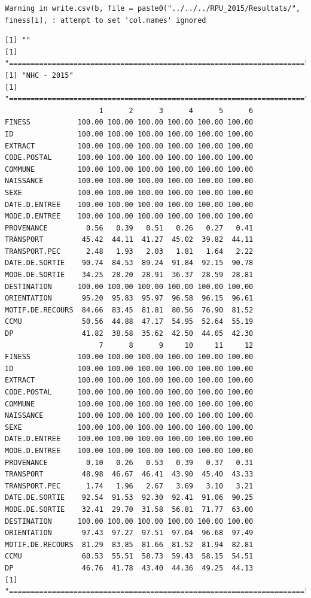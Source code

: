 \documentclass[]{article}
\begin{document}
\begin{verbatim}
Warning in write.csv(b, file = paste0("../../../RPU_2015/Resultats/",
finess[i], : attempt to set 'col.names' ignored
\end{verbatim}

\begin{verbatim}
[1] ""
[1] "====================================================================="
[1] "NHC - 2015"
[1] "====================================================================="
                      1      2      3      4      5      6
FINESS           100.00 100.00 100.00 100.00 100.00 100.00
ID               100.00 100.00 100.00 100.00 100.00 100.00
EXTRACT          100.00 100.00 100.00 100.00 100.00 100.00
CODE.POSTAL      100.00 100.00 100.00 100.00 100.00 100.00
COMMUNE          100.00 100.00 100.00 100.00 100.00 100.00
NAISSANCE        100.00 100.00 100.00 100.00 100.00 100.00
SEXE             100.00 100.00 100.00 100.00 100.00 100.00
DATE.D.ENTREE    100.00 100.00 100.00 100.00 100.00 100.00
MODE.D.ENTREE    100.00 100.00 100.00 100.00 100.00 100.00
PROVENANCE         0.56   0.39   0.51   0.26   0.27   0.41
TRANSPORT         45.42  44.11  41.27  45.02  39.82  44.11
TRANSPORT.PEC      2.48   1.93   2.03   1.81   1.64   2.22
DATE.DE.SORTIE    90.74  84.53  89.24  91.84  92.15  90.78
MODE.DE.SORTIE    34.25  28.20  28.91  36.37  28.59  28.81
DESTINATION      100.00 100.00 100.00 100.00 100.00 100.00
ORIENTATION       95.20  95.83  95.97  96.58  96.15  96.61
MOTIF.DE.RECOURS  84.66  83.45  81.81  80.56  76.90  81.52
CCMU              50.56  44.88  47.17  54.95  52.64  55.19
DP                41.82  38.58  35.62  42.50  44.05  42.30
                      7      8      9     10     11     12
FINESS           100.00 100.00 100.00 100.00 100.00 100.00
ID               100.00 100.00 100.00 100.00 100.00 100.00
EXTRACT          100.00 100.00 100.00 100.00 100.00 100.00
CODE.POSTAL      100.00 100.00 100.00 100.00 100.00 100.00
COMMUNE          100.00 100.00 100.00 100.00 100.00 100.00
NAISSANCE        100.00 100.00 100.00 100.00 100.00 100.00
SEXE             100.00 100.00 100.00 100.00 100.00 100.00
DATE.D.ENTREE    100.00 100.00 100.00 100.00 100.00 100.00
MODE.D.ENTREE    100.00 100.00 100.00 100.00 100.00 100.00
PROVENANCE         0.10   0.26   0.53   0.39   0.37   0.31
TRANSPORT         48.98  46.67  46.41  43.90  45.40  43.33
TRANSPORT.PEC      1.74   1.96   2.67   3.69   3.10   3.21
DATE.DE.SORTIE    92.54  91.53  92.30  92.41  91.06  90.25
MODE.DE.SORTIE    32.41  29.70  31.58  56.81  71.77  63.00
DESTINATION      100.00 100.00 100.00 100.00 100.00 100.00
ORIENTATION       97.43  97.27  97.51  97.04  96.68  97.49
MOTIF.DE.RECOURS  81.29  83.85  81.66  81.52  81.94  82.81
CCMU              60.53  55.51  58.73  59.43  58.15  54.51
DP                46.76  41.78  43.40  44.36  49.25  44.13
[1] "====================================================================="
\end{verbatim}
\end{document}
